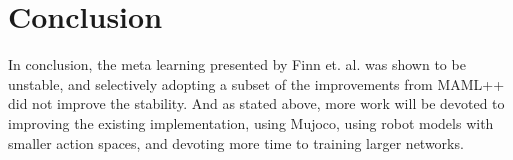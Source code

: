 \documentclass{scrartcl}
\theoremstyle{definition}
\theoremstyle{note}
\begin{document}
\section{Conclusion}
In conclusion, the meta learning presented by Finn et. al. was shown to be unstable, and 
selectively adopting a subset of the improvements from MAML++ did not improve the stability.
And as stated above, more work will be devoted to improving the existing implementation, using Mujoco, 
using robot models with smaller action spaces, and devoting more time to training larger networks.

\printbibliography
\end{document}
